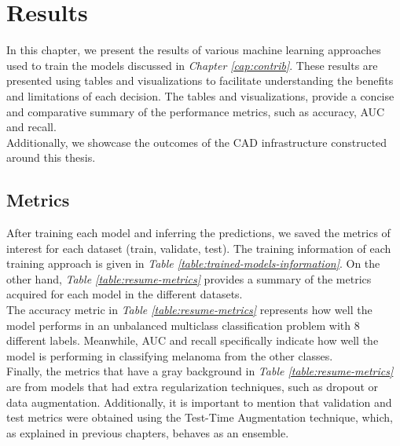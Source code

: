 \chapter{Results}
\label{cap:result}

In this chapter, we present the results of various machine learning
approaches used to train the models discussed in \textit{Chapter \ref{cap:contrib}}.
These results are presented using tables and visualizations to
facilitate understanding the benefits and limitations of each decision. The tables and visualizations,
provide a concise and comparative summary of the performance metrics, such as accuracy, AUC and recall. \\

Additionally, we showcase the outcomes of the CAD infrastructure constructed around this thesis.


\section{Metrics}

After training each model and inferring the predictions,
we saved the metrics of interest for each dataset (train, validate, test).
The training information of each training approach is given in \textit{Table \ref{table:trained-models-information}}.
On the other hand, \textit{Table \ref{table:resume-metrics}} provides a summary of the metrics acquired for each model in the different datasets. \\

The accuracy metric in \textit{Table \ref{table:resume-metrics}} represents how well
the model performs in an unbalanced multiclass classification problem with 8 different labels.
Meanwhile, AUC and recall specifically indicate how well the model is performing
in classifying melanoma from the other classes. \\


Finally, the metrics that have a gray background in \textit{Table \ref{table:resume-metrics}} are from models that had extra regularization techniques,
such as dropout or data augmentation. Additionally, it is important to mention that validation and test metrics were obtained using the Test-Time Augmentation technique,
which, as explained in previous chapters, behaves as an ensemble.

\newpage

